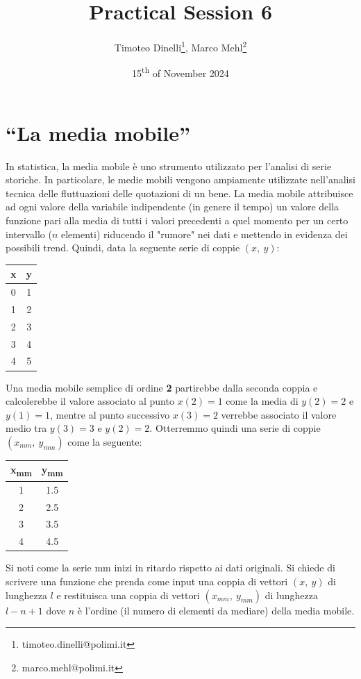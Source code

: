 \documentclass[oneside]{article}
\title{Practical Session 6}
\author{Timoteo Dinelli\footnote{timoteo.dinelli@polimi.it}, Marco Mehl\footnote{marco.mehl@polimi.it}}
\date{15\textsuperscript{th} of November 2024}
\begin{document}
\maketitle

\section{``La media mobile''}
In statistica, la media mobile è uno strumento utilizzato per l'analisi di serie
storiche. In particolare, le medie mobili vengono ampiamente utilizzate nell'analisi
tecnica delle fluttuazioni delle quotazioni di un bene. La media mobile attribuisce ad ogni valore della
variabile indipendente (in genere il tempo) un valore della funzione pari alla media di
tutti i valori precedenti a quel momento per un certo intervallo ($n$ elementi) riducendo
il "rumore" nei dati e mettendo in evidenza dei possibili trend.
Quindi, data la seguente serie di coppie $(x, \:y)$:
\begin{table}[h!]
   \centering
   \begin{tabular}{c | c}
      x & y \\ \hline
      0 & 1 \\
      1 & 2 \\
      2 & 3 \\
      3 & 4 \\
      4 & 5 \\ \hline
   \end{tabular}
\end{table}
Una media mobile semplice di ordine \textbf{2} partirebbe dalla seconda coppia e calcolerebbe il
valore associato al punto $x(2) = 1$ come la media di $y(2) = 2$ e $y(1) = 1$, mentre al punto
successivo $x(3) = 2$ verrebbe associato il valore medio tra $y(3) = 3$ e $y(2) = 2$. Otterremmo
quindi una serie di coppie $(x_{mm}, \: y_{mm})$ come la seguente:
\begin{table}[h!]
   \centering
   \begin{tabular}{c | c}
      x\textsubscript{mm} & y\textsubscript{mm} \\ \hline
      1 & 1.5 \\
      2 & 2.5 \\
      3 & 3.5 \\
      4 & 4.5 \\ \hline
   \end{tabular}
\end{table}
Si noti come la serie mm inizi in ritardo rispetto ai dati originali. Si chiede di
scrivere una funzione che prenda come input una coppia di vettori $(x, \: y)$ di
lunghezza $l$ e restituisca una coppia di vettori $(x_{mm}, \: y_{mm})$ di lunghezza
$l-n+1$ dove $n$ è l'ordine (il numero di elementi da mediare) della media mobile.
\end{document}
